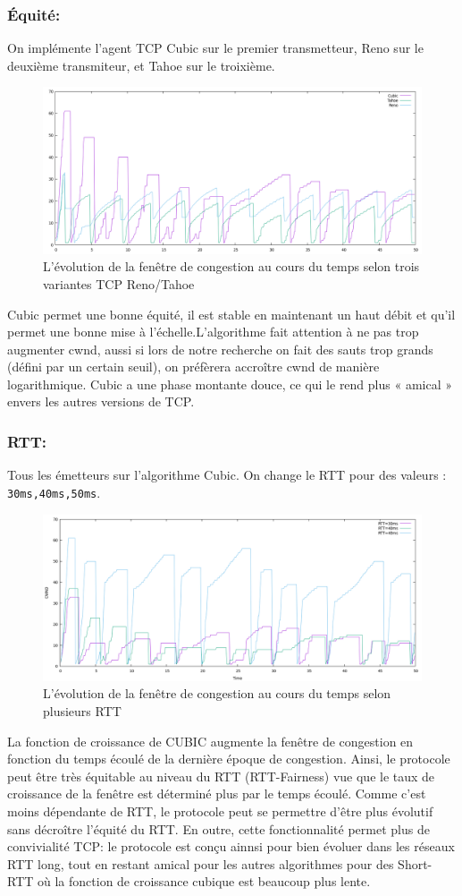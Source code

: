 \documentclass[a4paper,12pt]{article}
\begin{document}
\subsubsection{Équité:}
On implémente l'agent TCP Cubic sur le premier transmetteur, Reno sur le deuxième transmiteur, et Tahoe sur le troixième.
\begin{figure}[H]
\centering
\includegraphics[width=16cm]{img/cubic_reno_tahoe.png}
\caption{L'évolution de la fenêtre de congestion au cours du temps selon trois variantes TCP Reno/Tahoe}
\end{figure}
Cubic permet une bonne équité, il est stable en maintenant un haut débit et qu'il permet une bonne mise à l'échelle.L'algorithme fait attention à ne pas trop augmenter cwnd, aussi si lors de notre recherche on fait des sauts trop grands (défini par un certain seuil), on préfèrera accroître cwnd de manière logarithmique. Cubic a une phase montante douce, ce qui le rend plus « amical » envers les autres versions de TCP.
\subsubsection{RTT:}
Tous les émetteurs sur l'algorithme Cubic. On change le RTT pour des valeurs : \texttt{30ms,40ms,50ms}.
\begin{figure}[H]
\centering
\includegraphics[width=16cm]{img/RTT_Cubic.png}
\caption{L'évolution de la fenêtre de congestion au cours du temps selon plusieurs RTT}
\end{figure}
	La fonction de croissance de CUBIC augmente la fenêtre de congestion en fonction du temps écoulé
de la dernière époque de congestion. Ainsi, le protocole peut être très équitable au niveau du RTT (RTT-Fairness) vue que le taux de croissance de la fenêtre est déterminé plus par le temps écoulé. Comme c'est moins dépendante de RTT, le protocole peut se permettre d'être plus évolutif sans décroître l'équité du RTT. En outre, cette fonctionnalité permet plus de convivialité TCP: le protocole est conçu ainnsi pour bien évoluer dans les réseaux RTT long, tout en restant amical pour les autres algorithmes pour des Short-RTT où la fonction de croissance cubique est beaucoup plus lente.
\end{document}
